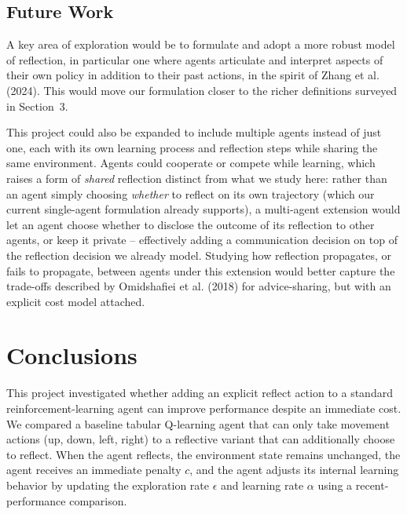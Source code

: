 \documentclass[11pt]{article}
\begin{document}
\subsection{Future Work}

A key area of exploration would be to formulate and adopt a more robust model of reflection, in particular one where agents articulate and interpret aspects of their own policy in addition to their past actions, in the spirit of Zhang et al. (2024). This would move our formulation closer to the richer definitions surveyed in Section~3.

This project could also be expanded to include multiple agents instead of just one, each with its own learning process and reflection steps while sharing the same environment. Agents could cooperate or compete while learning, which raises a form of \emph{shared} reflection distinct from what we study here: rather than an agent simply choosing \emph{whether} to reflect on its own trajectory (which our current single-agent formulation already supports), a multi-agent extension would let an agent choose whether to disclose the outcome of its reflection to other agents, or keep it private -- effectively adding a communication decision on top of the reflection decision we already model. Studying how reflection propagates, or fails to propagate, between agents under this extension would better capture the trade-offs described by Omidshafiei et al. (2018) for advice-sharing, but with an explicit cost model attached.

\section{Conclusions}

This project investigated whether adding an explicit reflect action to a standard reinforcement-learning agent can improve performance despite an immediate cost. We compared a baseline tabular Q-learning agent that can only take movement actions (up, down, left, right) to a reflective variant that can additionally choose to reflect. When the agent reflects, the environment state remains unchanged, the agent receives an immediate penalty $c$, and the agent adjusts its internal learning behavior by updating the exploration rate $\epsilon$ and learning rate $\alpha$ using a recent-performance comparison.
\end{document}
